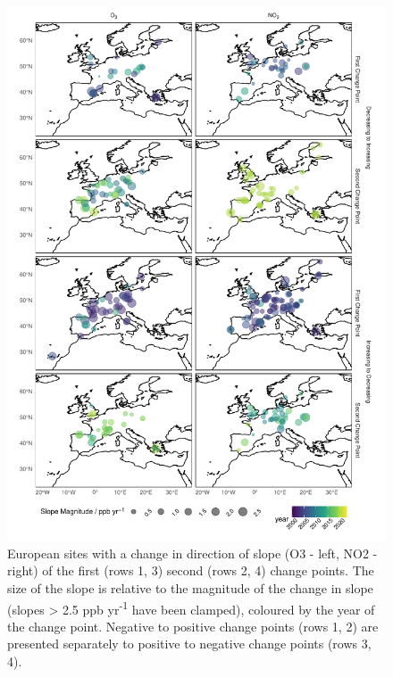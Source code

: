 \documentclass[journal abbreviation, manuscript]{copernicus}
\begin{document}
\begin{figure}[p]
\includegraphics[width=12cm,keepaspectratio]{figures/f9_eu_mag_map.pdf}
\caption{European sites with a change in direction of slope (O3 - left, NO2 - right) of the first (rows 1, 3) second (rows 2, 4) change points. The size of the slope is relative to the magnitude of the change in slope (slopes > 2.5 ppb yr\textsuperscript{-1} have been clamped), coloured by the year of the change point. Negative to positive change points (rows 1, 2) are presented separately to positive to negative change points (rows 3, 4).}
\label{fig:eu_changepoint_map}
\end{figure}
\end{document}
